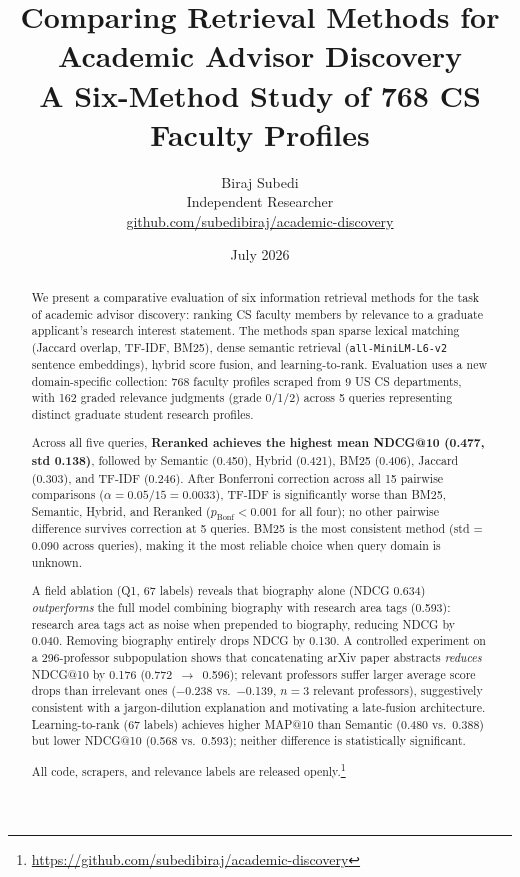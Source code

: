 \documentclass[11pt,a4paper]{article}
\title{
    \vspace{-1cm}
    {\LARGE \textbf{Comparing Retrieval Methods for Academic Advisor Discovery}} \\[0.4em]
    {\large A Six-Method Study of 768 CS Faculty Profiles}
}
\author{
    Biraj Subedi \\
    \small Independent Researcher \\
    \small \href{https://github.com/subedibiraj/academic-discovery}{github.com/subedibiraj/academic-discovery}
}
\date{July 2026}
\begin{document}
\maketitle

\begin{abstract}
We present a comparative evaluation of six information retrieval methods
for the task of academic advisor discovery: ranking CS faculty members
by relevance to a graduate applicant's research interest statement.
The methods span sparse lexical matching (Jaccard overlap, TF-IDF, BM25),
dense semantic retrieval (\texttt{all-MiniLM-L6-v2} sentence embeddings),
hybrid score fusion, and learning-to-rank.
Evaluation uses a new domain-specific collection: 768 faculty profiles
scraped from 9 US CS departments, with 162 graded relevance judgments
(grade 0/1/2) across 5 queries representing distinct graduate student
research profiles.

Across all five queries, \textbf{Reranked achieves the highest mean
NDCG@10 (0.477, std 0.138)}, followed by Semantic (0.450), Hybrid (0.421),
BM25 (0.406), Jaccard (0.303), and TF-IDF (0.246).
After Bonferroni correction across all 15 pairwise comparisons
($\alpha = 0.05/15 = 0.0033$), TF-IDF is significantly worse than
BM25, Semantic, Hybrid, and Reranked ($p_{\text{Bonf}} < 0.001$ for all four);
no other pairwise difference survives correction at 5 queries.
BM25 is the most consistent method (std = 0.090 across queries),
making it the most reliable choice when query domain is unknown.

A field ablation (Q1, 67 labels) reveals that biography alone (NDCG 0.634)
\emph{outperforms} the full model combining biography with research area
tags (0.593): research area tags act as noise when prepended to biography,
reducing NDCG by 0.040. Removing biography entirely drops NDCG by 0.130.
A controlled experiment on a 296-professor subpopulation shows that
concatenating arXiv paper abstracts \emph{reduces} NDCG@10 by 0.176
(0.772~$\to$~0.596); relevant professors suffer larger average score drops
than irrelevant ones ($-$0.238 vs.\ $-$0.139, $n=3$ relevant professors),
suggestively consistent with a jargon-dilution explanation and motivating
a late-fusion architecture.
Learning-to-rank (67 labels) achieves higher MAP@10 than Semantic
(0.480 vs.\ 0.388) but lower NDCG@10 (0.568 vs.\ 0.593); neither
difference is statistically significant.

All code, scrapers, and relevance labels are released openly.\footnote{%
\url{https://github.com/subedibiraj/academic-discovery}}
\end{abstract}
\end{document}
